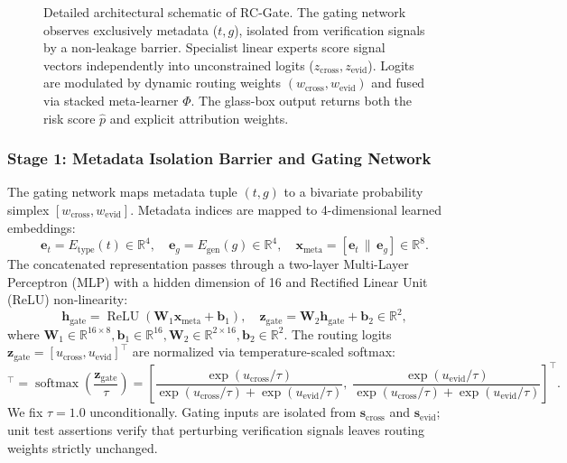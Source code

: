 \documentclass[pdflatex,sn-mathphys,Numbered]{sn-jnl}
\begin{document}
\begin{figure}[!htbp]
{%
}
\caption{Detailed architectural schematic of RC-Gate. The gating network observes exclusively metadata ($t, g$), isolated from verification signals by a non-leakage barrier. Specialist linear experts score signal vectors independently into unconstrained logits ($z_{\mathrm{cross}}, z_{\mathrm{evid}}$). Logits are modulated by dynamic routing weights $(w_{\mathrm{cross}}, w_{\mathrm{evid}})$ and fused via stacked meta-learner $\Phi$. The glass-box output returns both the risk score $\hat{p}$ and explicit attribution weights.}\label{fig:arch}
\end{figure}

\subsubsection{Stage 1: Metadata Isolation Barrier and Gating Network}
The gating network maps metadata tuple $(t, g)$ to a bivariate probability simplex $[w_{\mathrm{cross}}, w_{\mathrm{evid}}]$. Metadata indices are mapped to 4-dimensional learned embeddings:
\begin{equation}
\mathbf{e}_t = E_{\mathrm{type}}(t) \in \mathbb{R}^4, \quad \mathbf{e}_g = E_{\mathrm{gen}}(g) \in \mathbb{R}^4, \quad \mathbf{x}_{\mathrm{meta}} = [\mathbf{e}_t \,\|\, \mathbf{e}_g] \in \mathbb{R}^8.
\end{equation}
The concatenated representation passes through a two-layer Multi-Layer Perceptron (MLP) with a hidden dimension of 16 and Rectified Linear Unit (ReLU) non-linearity:
\begin{equation}
\mathbf{h}_{\mathrm{gate}} = \operatorname{ReLU}(\mathbf{W}_1 \mathbf{x}_{\mathrm{meta}} + \mathbf{b}_1), \quad \mathbf{z}_{\mathrm{gate}} = \mathbf{W}_2 \mathbf{h}_{\mathrm{gate}} + \mathbf{b}_2 \in \mathbb{R}^2,
\end{equation}
where $\mathbf{W}_1 \in \mathbb{R}^{16 \times 8}, \mathbf{b}_1 \in \mathbb{R}^{16}, \mathbf{W}_2 \in \mathbb{R}^{2 \times 16}, \mathbf{b}_2 \in \mathbb{R}^2$. The routing logits $\mathbf{z}_{\mathrm{gate}} = [u_{\mathrm{cross}}, u_{\mathrm{evid}}]^{\top}$ are normalized via temperature-scaled softmax:
\begin{equation}
[w_{\mathrm{cross}}, w_{\mathrm{evid}}]^{\top} = \operatorname{softmax}\left(\frac{\mathbf{z}_{\mathrm{gate}}}{\tau}\right) = \left[ \frac{\exp(u_{\mathrm{cross}}/\tau)}{\exp(u_{\mathrm{cross}}/\tau) + \exp(u_{\mathrm{evid}}/\tau)}, \; \frac{\exp(u_{\mathrm{evid}}/\tau)}{\exp(u_{\mathrm{cross}}/\tau) + \exp(u_{\mathrm{evid}}/\tau)} \right]^{\top}.
\end{equation}
We fix $\tau = 1.0$ unconditionally. Gating inputs are isolated from $\mathbf{s}_{\mathrm{cross}}$ and $\mathbf{s}_{\mathrm{evid}}$; unit test assertions verify that perturbing verification signals leaves routing weights strictly unchanged.
\end{document}
